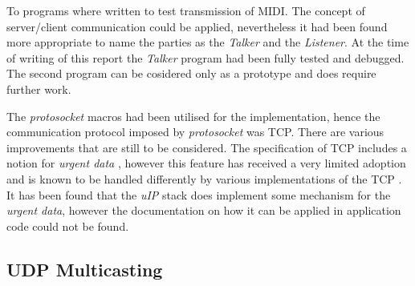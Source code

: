 
  To programs where written to test transmission of MIDI. The concept of
 server/client communication could be applied, nevertheless it had been
 found more appropriate to name the parties as the \emph{Talker} and the
 \emph{Listener}. At the time of writing of this report the \emph{Talker}
 program had been fully tested and debugged. The second program can be
 cosidered only as a prototype and does require further work.

  The \emph{protosocket} macros had been utilised for the implementation,
 hence the communication protocol imposed by \emph{protosocket} was TCP.
 There are various improvements that are still to be considered.
 The specification of TCP includes a notion for \emph{urgent data}
 , however this feature has received a very limited adoption and
 is known to be handled differently by various implementations of the TCP
 \cite{ietf:draft:tcpm-urgent-data}. It has been found that the \emph{uIP}
 stack does implement some mechanism for the \emph{urgent data}, however
 the documentation on how it can be applied in \Contiki application code
 could not be found. 


 

\subsection{UDP Multicasting}

